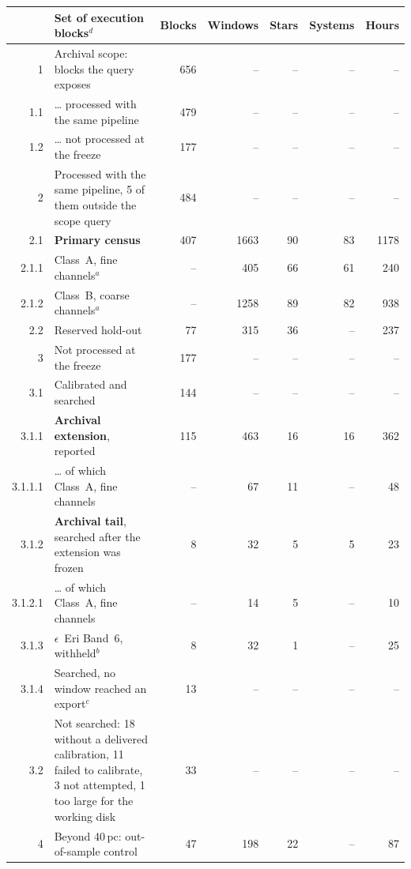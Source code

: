 \begin{tabular}{@{}r@{~}p{}rrrrr@{}}
\hline
 & Set of execution blocks$^{d}$ & Blocks & Windows & Stars & Systems & Hours \\
\hline
1 & Archival scope: blocks the query exposes & 656 & -- & -- & -- & -- \\
1.1 & \hspace{0.8em}\ldots{} processed with the same pipeline & 479 & -- & -- & -- & -- \\
1.2 & \hspace{0.8em}\ldots{} not processed at the freeze & 177 & -- & -- & -- & -- \\
\hline
2 & Processed with the same pipeline, 5 of them outside the scope query & 484 & -- & -- & -- & -- \\
2.1 & \hspace{0.8em}\textbf{Primary census} & 407 & 1663 & 90 & 83 & 1178 \\
2.1.1 & \hspace{1.6em}Class~A, fine channels$^{a}$ & -- & 405 & 66 & 61 & 240 \\
2.1.2 & \hspace{1.6em}Class~B, coarse channels$^{a}$ & -- & 1258 & 89 & 82 & 938 \\
2.2 & \hspace{0.8em}Reserved hold-out & 77 & 315 & 36 & -- & 237 \\
\hline
3 & Not processed at the freeze & 177 & -- & -- & -- & -- \\
3.1 & \hspace{0.8em}Calibrated and searched & 144 & -- & -- & -- & -- \\
3.1.1 & \hspace{1.6em}\textbf{Archival extension}, reported & 115 & 463 & 16 & 16 & 362 \\
3.1.1.1 & \hspace{2.4em}\ldots{} of which Class~A, fine channels & -- & 67 & 11 & -- & 48 \\
3.1.2 & \hspace{1.6em}\textbf{Archival tail}, searched after the extension was frozen & 8 & 32 & 5 & 5 & 23 \\
3.1.2.1 & \hspace{2.4em}\ldots{} of which Class~A, fine channels & -- & 14 & 5 & -- & 10 \\
3.1.3 & \hspace{1.6em}$\epsilon$~Eri Band~6, withheld$^{b}$ & 8 & 32 & 1 & -- & 25 \\
3.1.4 & \hspace{1.6em}Searched, no window reached an export$^{c}$ & 13 & -- & -- & -- & -- \\
3.2 & \hspace{0.8em}Not searched: 18 without a delivered calibration, 11 failed to calibrate, 3 not attempted, 1 too large for the working disk & 33 & -- & -- & -- & -- \\
\hline
4 & Beyond 40\,pc: out-of-sample control & 47 & 198 & 22 & -- & 87 \\
\hline
\end{tabular}

